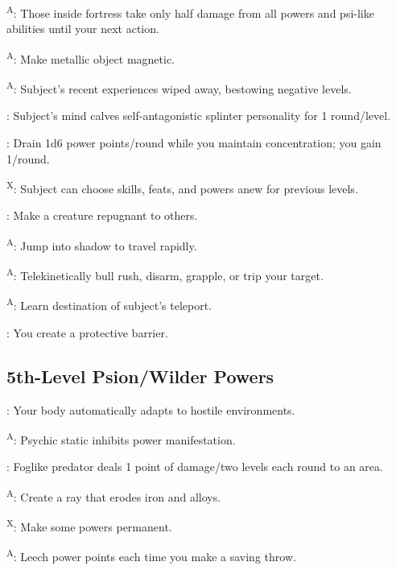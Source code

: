 \textsuperscript{A}: Those inside fortress take only half damage from all powers and psi-like abilities until your next action.

\textsuperscript{A}: Make metallic object magnetic.

\textsuperscript{A}: Subject’s recent experiences wiped away, bestowing negative levels.

: Subject’s mind calves self-antagonistic splinter personality for 1 round/level.

: Drain 1d6 power points/round while you maintain concentration; you gain 1/round.

\textsuperscript{X}: Subject can choose skills, feats, and powers anew for previous levels.

: Make a creature repugnant to others.

\textsuperscript{A}: Jump into shadow to travel rapidly.

\textsuperscript{A}: Telekinetically bull rush, disarm, grapple, or trip your target.

\textsuperscript{A}: Learn destination of subject’s teleport.

: You create a protective barrier.




\subsection{5th-Level Psion/Wilder Powers}

: Your body automatically adapts to hostile environments.

\textsuperscript{A}: Psychic static inhibits power manifestation.

: Foglike predator deals 1 point of damage/two levels each round to an area.

\textsuperscript{A}: Create a ray that erodes iron and alloys.

\textsuperscript{X}: Make some powers permanent.

\textsuperscript{A}: Leech power points each time you make a saving throw.

